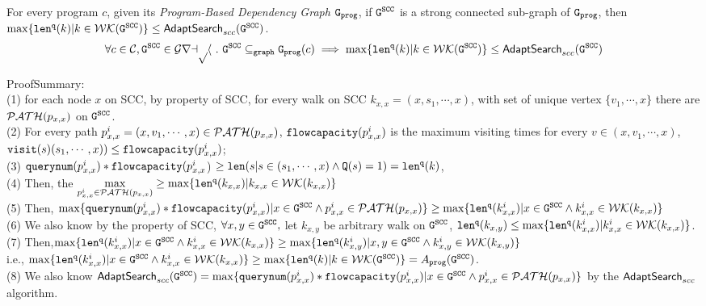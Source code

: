 \begin{lem}
  \label{lem:sound_adaptalg_scc}
  For every program $c$, given its \emph{Program-Based Dependency Graph} $\mathtt{{G_{prog}}}$, if $\mathtt{G^{SCC}}$ is a strong connected sub-graph of $\mathtt{{G_{prog}}}$, then
  $\max\{\mathtt{len}^{\tt q}(k) | k \in \mathcal{WK}(\mathtt{G^{SCC}})\} \leq \mathsf{AdaptSearch}_{scc}(\mathtt{G^{SCC}}) $.
  \[
    \forall c \in \mathcal{C}, \mathtt{G^{SCC}} \in \mathcal{Graph} ~.~ \mathtt{G^{SCC}} \subseteq_{\mathtt{graph}} \mathtt{{G_{prog}}}(c)
    \implies 
    \max\{\mathtt{len}^{\tt q}(k) | k \in \mathcal{WK}(\mathtt{G^{SCC}})\} \leq \mathsf{AdaptSearch}_{scc}(\mathtt{G^{SCC}}) 
    \]
\end{lem}

ProofSummary:
\\
(1) for each node $x$ on SCC, by property of SCC, 
for every walk on SCC $k_{x, x} = (x, s_1, \cdots, x)$,
with set of unique vertex $\{v_1, \cdots, x\}$
there are $\mathcal{PATH}(p_{x,x})$ on $\mathtt{G^{SCC}}$.
\\
(2) For every path $p_{x,x}^{i} = (x, v_1, \cdots, x) \in \mathcal{PATH}(p_{x,x})$,  
$\mathtt{flowcapacity} (p_{x,x}^{i})$ is the maximum visiting times for every $v \in (x, v_1, \cdots, x)$, 
$\mathtt{visit}(s) (s_1, \cdots, x)) \leq \mathtt{flowcapacity}(p_{x,x}^{i})$;
\\
(3) $\mathtt{querynum}(p_{x,x}^{i})  * \mathtt{flowcapacity}(p_{x,x}^{i}$)  $\geq\mathtt{len}(s | s \in ( s_1, \cdots, x) \land \mathtt{Q}(s) = 1) =  \mathtt{len}^{\tt q}(k)$,
\\
(4) Then, the $\max\limits_{p_{x,x}^{i} \in \mathcal{PATH}(p_{x,x})} \geq \max\{\mathtt{len}^{\tt q}(k_{x, x}) | k_{x, x} \in \mathcal{WK}(k_{x, x})\}$
\\
(5) Then,  $\max\{\mathtt{querynum}(p_{x,x}^{i})  * \mathtt{flowcapacity}(p_{x,x}^{i}) | x \in \mathtt{G^{SCC}} \land {p_{x,x}^{i} \in \mathcal{PATH}(p_{x,x})} \} 
\geq \max\{\mathtt{len}^{\tt q}(k_{x, x}^i) |x \in \mathtt{G^{SCC}} \land  k_{x, x}^i \in \mathcal{WK}(k_{x, x})\}$
\\
(6) We also know by the property of SCC, $\forall x, y \in \mathtt{G^{SCC}}, $ let $k_{x, y}$ be arbitrary walk on $\mathtt{G^{SCC}}$,
 $\mathtt{len}^{\tt q}(k_{x, y}) \leq \max\{\mathtt{len}^{\tt q}(k_{x, x}^i) | k_{x, x}^i \in \mathcal{WK}(k_{x, x})\}$.
\\
(7) Then,$ \max\{\mathtt{len}^{\tt q}(k_{x, x}^i) |x \in \mathtt{G^{SCC}} \land  k_{x, x}^i \in \mathcal{WK}(k_{x, x})\} \geq  \max\{\mathtt{len}^{\tt q}(k_{x, y}^i) |x, y \in \mathtt{G^{SCC}} \land  k_{x, y}^i \in \mathcal{WK}(k_{x, y})\}$
\\
i.e., 
$ \max\{\mathtt{len}^{\tt q}(k_{x, x}^i) |x \in \mathtt{G^{SCC}} \land  k_{x, x}^i \in \mathcal{WK}(k_{x, x})\} \geq  \max\{\mathtt{len}^{\tt q}(k) | k\in \mathcal{WK}(\mathtt{G^{SCC}})\} = A_{\mathtt{prog}}(\mathtt{G^{SCC}})$.
\\
(8) We also know 
$\mathsf{AdaptSearch}_{scc}(\mathtt{G^{SCC}}) = \max\{\mathtt{querynum}(p_{x,x}^{i})  * \mathtt{flowcapacity}(p_{x,x}^{i}) | x \in \mathtt{G^{SCC}} \land {p_{x,x}^{i} \in \mathcal{PATH}(p_{x,x})} \} $ by the $\mathsf{AdaptSearch}_{scc}$ algorithm.
